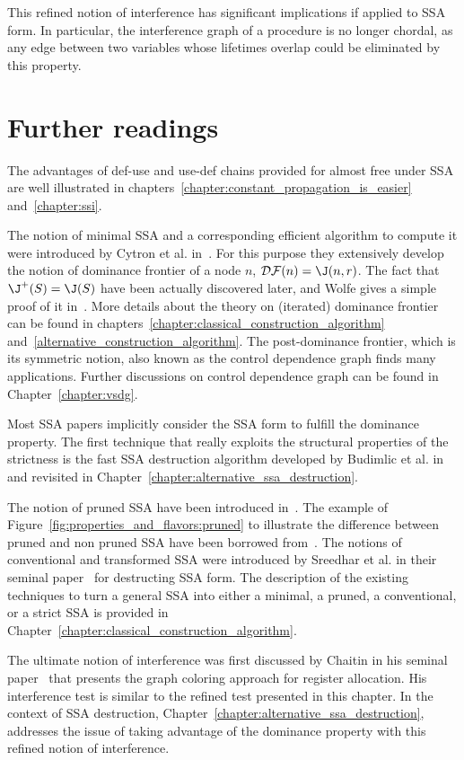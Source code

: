 This refined notion of interference has significant implications if
applied to SSA form. In particular, the interference graph of a procedure
is no longer chordal, as any edge between two variables whose lifetimes
overlap could be eliminated by this property. 


\section{Further readings}
The advantages of def-use and use-def chains provided for almost free under SSA are well illustrated in chapters~\ref{chapter:constant_propagation_is_easier} and~\ref{chapter:ssi}.

The notion of minimal SSA and a corresponding efficient algorithm to compute it were introduced by Cytron et al. in~\cite{CytronOct91}. For this purpose they extensively develop the notion of dominance frontier of a node $n$, ${\cal DF}(n)=\J(n,r)$. The fact that $\J^+(S)=\J(S)$ have been actually discovered later, and Wolfe gives a simple proof of it in~\cite{WolfeJul94}. More details about the theory on (iterated) dominance frontier can be found in chapters~\ref{chapter:classical_construction_algorithm} and~\ref{alternative_construction_algorithm}. The post-dominance frontier, which is its symmetric notion, also known as the control dependence graph finds many applications. Further discussions on control dependence graph can be found in Chapter~\ref{chapter:vsdg}. 

Most SSA papers implicitly consider the SSA form to fulfill the dominance property. The first technique that really exploits the structural properties of the strictness is the fast SSA destruction algorithm developed by Budimlic et al. in~\cite{BudimlicJun02} and revisited in Chapter~\ref{chapter:alternative_ssa_destruction}. 

The notion of pruned SSA  have been introduced in~\cite{ChoiJan91}. The example of Figure~\ref{fig:properties_and_flavors:pruned} to illustrate the difference between pruned and non pruned SSA have been borrowed from~\cite{CytronOct91}. 
The notions of conventional and transformed SSA were introduced by Sreedhar et al. in their seminal paper~\cite{SreedharSep99} for destructing SSA form.
The description of the existing techniques to turn a general SSA into either a minimal, a pruned, a conventional, or a strict SSA is provided in Chapter~\ref{chapter:classical_construction_algorithm}.

The ultimate notion of interference was first discussed by Chaitin in his seminal paper~\cite{Chaitin81} that presents the graph coloring approach for register allocation. His interference test is similar to the refined test presented in this chapter. In the context of SSA destruction, Chapter~\ref{chapter:alternative_ssa_destruction}, addresses the issue of taking advantage of the dominance property with this refined notion of interference.
 

